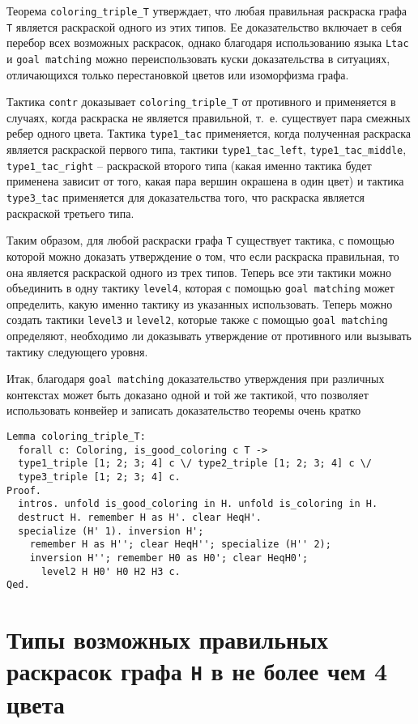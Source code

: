 Теорема {\tt coloring\_triple\_T} утверждает, что любая правильная раскраска графа {\tt T} является раскраской одного из этих типов. Ее доказательство включает в себя перебор всех возможных раскрасок, однако благодаря использованию языка {\tt Ltac} и {\tt goal matching} можно переиспользовать куски доказательства в ситуациях, отличающихся только перестановкой цветов или изоморфизма графа.

Тактика {\tt contr} доказывает {\tt coloring\_triple\_T} от противного и применяется в случаях, когда раскраска не является правильной, т.~е. существует пара смежных ребер одного цвета. Тактика {\tt type1\_tac} применяется, когда полученная раскраска является раскраской первого типа, тактики {\tt type1\_tac\_left}, {\tt type1\_tac\_middle}, {\tt type1\_tac\_right} -- раскраской второго типа (какая именно тактика будет применена зависит от того, какая пара вершин окрашена в один цвет) и тактика {\tt type3\_tac} применяется для доказательства того, что раскраска является раскраской третьего типа.

Таким образом, для любой раскраски графа {\tt T} существует тактика, с помощью которой можно доказать утверждение о том, что если раскраска правильная, то она является раскраской одного из трех типов. Теперь все эти тактики можно объединить в одну тактику {\tt level4}, которая с помощью {\tt goal matching} может определить, какую именно тактику из указанных использовать. Теперь можно создать тактики {\tt level3} и {\tt level2}, которые также с помощью {\tt goal matching} определяют, необходимо ли доказывать утверждение от противного или вызывать тактику следующего уровня.

Итак, благодаря {\tt goal matching} доказательство утверждения при различных контекстах может быть доказано одной и той же тактикой, что позволяет использовать конвейер и записать доказательство теоремы очень кратко

\begin{verbatim}
Lemma coloring_triple_T:
  forall c: Coloring, is_good_coloring c T ->
  type1_triple [1; 2; 3; 4] c \/ type2_triple [1; 2; 3; 4] c \/
  type3_triple [1; 2; 3; 4] c.
Proof.
  intros. unfold is_good_coloring in H. unfold is_coloring in H. 
  destruct H. remember H as H'. clear HeqH'. 
  specialize (H' 1). inversion H';
    remember H as H''; clear HeqH''; specialize (H'' 2); 
    inversion H''; remember H0 as H0'; clear HeqH0';
      level2 H H0' H0 H2 H3 c.
Qed.
\end{verbatim}

\section{Типы возможных правильных раскрасок графа {\tt H} в не более чем 4 цвета}

